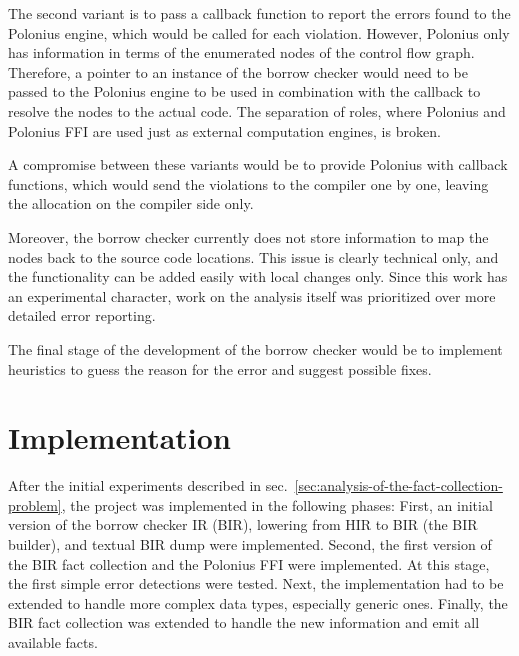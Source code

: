 \documentclass[
  11pt,
  twoside,symmetric]{report}
\begin{document}
The second variant is to pass a callback function to report the errors
found to the Polonius engine, which would be called for each violation.
However, Polonius only has information in terms of the enumerated nodes
of the control flow graph. Therefore, a pointer to an instance of the
borrow checker would need to be passed to the Polonius engine to be used
in combination with the callback to resolve the nodes to the actual
code. The separation of roles, where Polonius and Polonius FFI are used
just as external computation engines, is broken.

A compromise between these variants would be to provide Polonius with
callback functions, which would send the violations to the compiler one
by one, leaving the allocation on the compiler side only.

Moreover, the borrow checker currently does not store information to map
the nodes back to the source code locations. This issue is clearly
technical only, and the functionality can be added easily with local
changes only. Since this work has an experimental character, work on the
analysis itself was prioritized over more detailed error reporting.

The final stage of the development of the borrow checker would be to
implement heuristics to guess the reason for the error and suggest
possible fixes.

\chapter{Implementation}\label{implementation}

After the initial experiments described in
sec.~\ref{sec:analysis-of-the-fact-collection-problem}, the project was
implemented in the following phases: First, an initial version of the
borrow checker IR (BIR), lowering from HIR to BIR (the BIR builder), and
textual BIR dump were implemented. Second, the first version of the BIR
fact collection and the Polonius FFI were implemented. At this stage,
the first simple error detections were tested. Next, the implementation
had to be extended to handle more complex data types, especially generic
ones. Finally, the BIR fact collection was extended to handle the new
information and emit all available facts.
\end{document}
